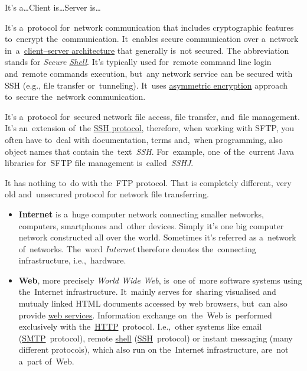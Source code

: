 \label{clientserverarchitecture}
\newline\todo It's a\dots Client is\dots Server is\dots


\label{tcp}

\label{ip}

\label{http}

\label{smtp}

\label{ssh}
It's a~protocol for~network communication that includes cryptographic features to~encrypt the~communication. It~enables secure communication over a~network in~a~\hyperref[clientserverarchitecture]{client--server architecture} that generally is~not secured. The abbreviation stands for \textit{Secure \hyperref[shellcligui]{Shell}}. It's typically used for~remote command line login and~remote commands execution, but~any network service can be secured with SSH (e.g., file transfer or~tunneling). It~uses \hyperref[asymmetricencryption]{asymmetric encryption} approach to~secure the~network communication.

\label{sftp}
It's a~protocol for~secured network file access, file transfer, and~file management. It's an~extension of~the \hyperref[ssh]{SSH protocol}, therefore, when working with SFTP, you often have to~deal with documentation, terms and,~when programming, also object names that contain the~text~\textit{SSH}. For~example, one~of the~current Java libraries for~SFTP file management is~called~\textit{SSHJ}.

\warning It has nothing to~do with the~FTP protocol. That is completely different, very old and~unsecured protocol for network file transferring.

\label{internetweb}
\begin{itemize}
    \item \textbf{Internet} is a~huge computer network connecting smaller networks, computers, smartphones and~other devices. Simply it's one big computer network constructed all over the world. Sometimes it's referred as a~network of~networks. The~word \textit{Internet} therefore denotes the~connecting infrastructure, i.e.,~hardware.
    \item \textbf{Web}, more precisely \textit{World Wide Web}, is~one of~more software systems using the~Internet infrastructure. It~mainly serves for~sharing visualised and mutualy linked HTML documents accessed by web browsers, but~can also provide \hyperref[webservice]{web services}. Information exchange on~the~Web is~performed exclusively with the~\hyperref[http]{HTTP}~protocol. I.e.,~other systems like email (\hyperref[smtp]{SMTP}~protocol), remote \hyperref[shellcligui]{shell} (\hyperref[ssh]{SSH}~protocol) or instant messaging (many different protocols), which also run on the~Internet infrastructure, are~not a~part of~Web.
\end{itemize}

